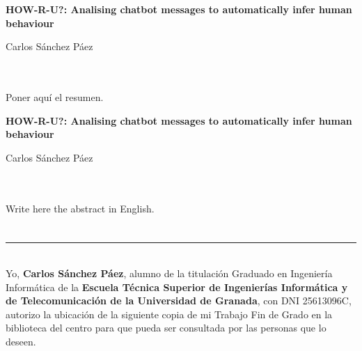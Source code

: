 
\cleardoublepage
\thispagestyle{empty}

\begin{center}
{\large\bfseries HOW-R-U?: Analising chatbot messages to automatically infer human behaviour}\\
\end{center}
\begin{center}
Carlos Sánchez Páez\\
\end{center}

\\

\vspace{0.7cm}
\\

Poner aquí el resumen.
\cleardoublepage


\thispagestyle{empty}


\begin{center}
{\large\bfseries HOW-R-U?: Analising chatbot messages to automatically infer human behaviour}\\
\end{center}
\begin{center}
Carlos Sánchez Páez\\
\end{center}

\\

\vspace{0.7cm}
\\

Write here the abstract in English.

\newpage

\section*{}
\thispagestyle{empty}

\noindent\rule[-1ex]{\textwidth}{2pt}\\[4.5ex]

Yo, \textbf{Carlos Sánchez Páez}, alumno de la titulación Graduado en Ingeniería Informática de la \textbf{Escuela Técnica Superior
de Ingenierías Informática y de Telecomunicación de la Universidad de Granada}, con DNI 25613096C, autorizo la
ubicación de la siguiente copia de mi Trabajo Fin de Grado en la biblioteca del centro para que pueda ser
consultada por las personas que lo deseen.

